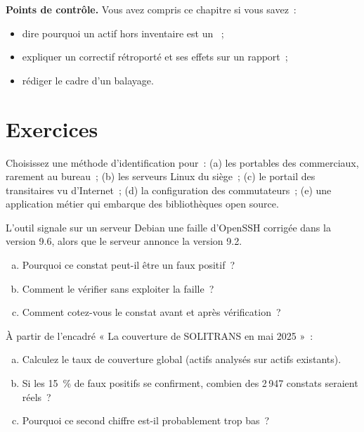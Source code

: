 \begin{boxinfo}
\textbf{Points de contrôle.} Vous avez compris ce chapitre si vous savez~:
\begin{itemize}
    \item dire pourquoi un actif hors inventaire est un \NEK{}~;
    \item expliquer un correctif rétroporté et ses effets sur un rapport~;
    \item rédiger le cadre d'un balayage.
\end{itemize}
\end{boxinfo}

\section*{Exercices}

\begin{boxexo}[title={\ding{45}\quad Exercice~10.1. Quelle méthode~? \niveaubase}]
Choisissez une méthode d'identification pour~: (a) les portables des
commerciaux, rarement au bureau~; (b) les serveurs Linux du siège~; (c) le
portail des transitaires vu d'Internet~; (d) la configuration des
commutateurs~; (e) une application métier qui embarque des bibliothèques
open source.
\end{boxexo}

\begin{boxexo}[title={\ding{45}\quad Exercice~10.2. Faux positif ou pas \niveaumoyen}]
L'outil signale sur un serveur Debian une faille d'OpenSSH corrigée dans la
version 9.6, alors que le serveur annonce la version 9.2.
\begin{enumerate}[(a)]
    \item Pourquoi ce constat peut-il être un faux positif~?
    \item Comment le vérifier sans exploiter la faille~?
    \item Comment cotez-vous le constat avant et après vérification~?
\end{enumerate}
\end{boxexo}

\begin{boxexo}[title={\ding{45}\quad Exercice~10.3. La couverture \niveaumoyen}]
À partir de l'encadré « La couverture de SOLITRANS en mai 2025 »~:
\begin{enumerate}[(a)]
    \item Calculez le taux de couverture global (actifs analysés sur actifs
          existants).
    \item Si les 15~\% de faux positifs se confirment, combien des 2\,947
          constats seraient réels~?
    \item Pourquoi ce second chiffre est-il probablement trop bas~?
\end{enumerate}
\end{boxexo}

